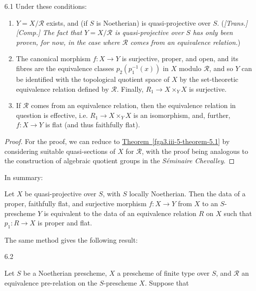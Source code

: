 \begin{theorem}{6.1}
    Under these conditions:

    
 \begin{enumerate}
      
 \item[i.]
        \(Y=X/\mathcal {R}\) exists, and (if \(S\) is Noetherian) is quasi-projective over \(S\).
         (\emph{[Trans.] \emph{[Comp.]} The fact that \(Y=X/\mathcal {R}\) is quasi-projective over \(S\) has only been proven, for now, in the case where \(\mathcal {R}\) comes from an equivalence relation.})
      


      
 \item[ii.]
        The canonical morphism \(f\colon  X\to  Y\) is surjective, proper, and open, and its fibres are the equivalence classes \(p_2(p_1^{-1}(x))\) in \(X\) modulo \(\mathcal {R}\), and so \(Y\) can be identified with the topological quotient space of \(X\) by the set-theoretic equivalence relation defined by \(\mathcal {R}\).
        Finally, \(R_1\to  X\times _Y X\) is surjective.
      


      
 \item[iii.]
        If \(\mathcal {R}\) comes from an equivalence relation, then the equivalence relation in question is effective, i.e. \(R_1\to  X\times _Y X\) is an isomorphism, and, further, \(f\colon  X\to  Y\) is flat (and thus faithfully flat).
      

    \end{enumerate}\begin{proof}\par{}For the proof, we can reduce to \hyperref[fga3.iii-5-theorem-5.1]{Theorem~\ref*{fga3.iii-5-theorem-5.1}} by considering suitable quasi-sections of \(X\) for \(\mathcal {R}\), with the proof being analogous to the construction of algebraic quotient groups in the \emph{Séminaire Chevalley}.\end{proof}\end{theorem}\par{}In summary:\begin{scholium}{}\label{fga3.iii-6-scholium}\skipsinglepar\par{}Let \(X\) be quasi-projective over \(S\), with \(S\) locally Noetherian.
    Then the data of a proper, faithfully flat, and surjective morphism \(f\colon  X\to  Y\) from \(X\) to an \(S\)-prescheme \(Y\) is equivalent to the data of an equivalence relation \(R\) on \(X\) such that \(p_1\colon  R\to  X\) is proper and flat.\end{scholium}\par{}The same method gives the following result:\begin{theorem}{6.2}\label{fga3.iii-6-theorem-6.2}\skipsinglepar\par{}Let \(S\) be a Noetherian prescheme, \(X\) a prescheme of finite type over \(S\), and \(\mathcal {R}\) an equivalence pre-relation on the \(S\)-prescheme \(X\).
    Suppose that


\end{theorem}

